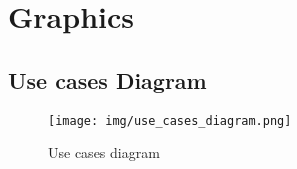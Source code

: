 \section{Graphics}
\label{sec:graph}

\subsection{Use cases Diagram}

\begin{landscape}
\begin{figure}[h!]
  \centering
  \texttt{[image: img/use\_cases\_diagram.png]}
  \caption{Use cases diagram}
  \label{fig:label}
 \end{figure}

\end{landscape}



